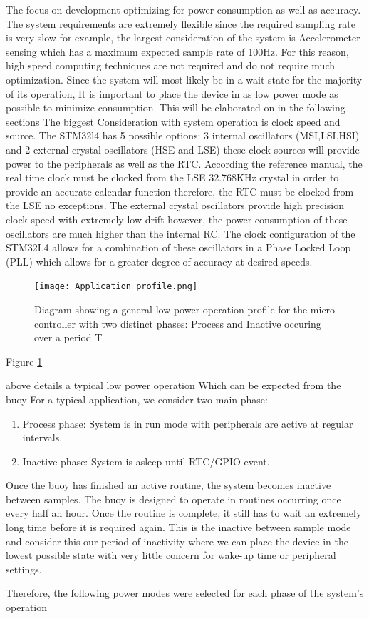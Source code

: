  The focus on development optimizing for power consumption as well as accuracy. The system requirements are extremely flexible since the required sampling rate is very slow for example, the largest consideration of the system is Accelerometer sensing which has a maximum expected sample rate of 100Hz. For this reason, high speed computing techniques are not required and do not require much optimization. Since the system will most likely be in a wait state for the majority of its operation, It is important to place the device in as low power mode as possible to minimize consumption. This will be elaborated on in the following sections
The biggest Consideration with system operation is clock speed and source. The STM32l4 has 5 possible options: 3 internal oscillators (MSI,LSI,HSI) and 2 external crystal oscillators (HSE and LSE) these clock sources will provide power to the peripherals as well as the RTC. According the reference manual, the real time clock must be clocked from the LSE 32.768KHz crystal in order to provide an accurate calendar function therefore, the RTC must be clocked from the LSE no exceptions. The external crystal oscillators provide high precision clock speed with extremely low drift however, the power consumption of these oscillators are much higher than the internal RC. The clock configuration of the STM32L4 allows for a combination of these oscillators in a Phase Locked Loop (PLL) which allows for a greater degree of accuracy at desired speeds. 

\begin{figure}[H]
    \centering
    \texttt{[image: Application profile.png]}
    \caption{Diagram showing a general low power operation profile  for the micro controller with two distinct phases: Process and Inactive occuring over a period T}
    \label{fig:appr}
\end{figure}

Figure \ref{fig:appr}

above details a typical low power operation Which can be expected from the buoy For a typical application, we consider two main phase:
\begin{enumerate}
    \item Process phase: System is in run mode with peripherals are active at regular intervals.
    \item Inactive phase: System is asleep until RTC/GPIO event.
\end{enumerate}

Once the buoy has finished an active routine, the system becomes inactive between samples. The buoy is designed to operate in routines occurring once every half an hour. Once the routine is complete, it still has to wait an extremely long time before it is required again. This is the inactive between sample mode and consider this our period of inactivity where we can place the device in the lowest possible state with very little concern for wake-up time or peripheral settings. \par 
Therefore, the following power modes were selected for each phase of the system's operation

